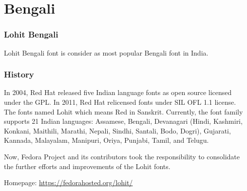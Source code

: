 \chapter{Bengali}


\subsection{Lohit Bengali}

Lohit Bengali font is consider as most popular Bengali font in India.

\subsection{History}
In 2004, Red Hat released five Indian language fonts as open source licensed
under the GPL. In 2011, Red Hat relicensed fonts under SIL OFL 1.1 license.
The fonts named Lohit which means Red in Sanskrit. Currently, the font family
supports 21 Indian languages: Assamese, Bengali, Devanagari (Hindi, Kashmiri,
Konkani, Maithili, Marathi, Nepali, Sindhi, Santali, Bodo, Dogri), Gujarati,
Kannada, Malayalam, Manipuri, Oriya, Punjabi, Tamil, and Telugu.

Now, Fedora Project and its contributors took the responsibility to consolidate
the further efforts and improvements of the Lohit fonts.

Homepage: {\url{https://fedorahosted.org/lohit/}}
